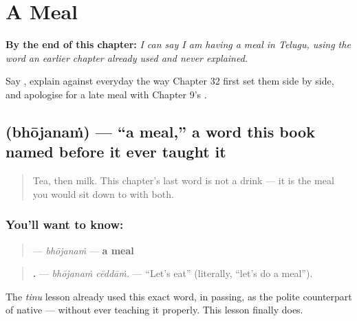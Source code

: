 
\chapter{A Meal}
\label{ch:te-a-meal}

\begin{chapteropening}
\textbf{By the end of this chapter:} \emph{I can say I am having a meal in Telugu, using the word an earlier chapter already used and never explained.}

Say  , explain  against everyday  the way Chapter 32 first set them side by side, and apologise for a late meal with Chapter 9's .
\end{chapteropening}

\section[\texorpdfstring{\te{భోజనం} (bhōjanaṁ)}{భోజనం (bhōjanaṁ)}]{ (bhōjanaṁ) — \textquotedblleft{}a meal,\textquotedblright{} a word this book named before it ever taught it}

\label{lesson:TE-C40-bhojanam}



\begin{quote}
Tea, then milk. This chapter's last word is not a drink — it is the meal you would sit down to with both.
\end{quote}

\subsection*{You'll want to know: }
\begin{quote}
\textbf{} — \emph{bhōjanaṁ} — \textbf{a meal}
\end{quote}

\begin{quote}
\textbf{ .} — \emph{bhōjanaṁ cēddāṁ.} — \textquotedblleft{}Let's eat\textquotedblright{} (literally, \textquotedblleft{}let's do a meal\textquotedblright{}).
\end{quote}

The \emph{tinu} lesson already used this exact word, in passing, as the polite counterpart of native \textbf{} — without ever teaching it properly. This lesson finally does.


